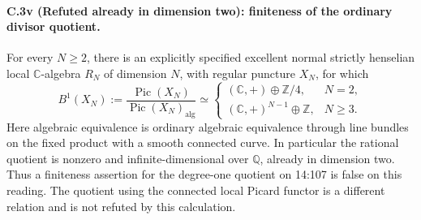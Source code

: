 \paragraph{C.3v (Refuted already in dimension two): finiteness of the ordinary divisor quotient.}
For every $N\ge2$, there is an explicitly specified excellent
normal strictly henselian local $\mathbb C$-algebra $R_N$ of
dimension $N$, with regular puncture $X_N$, for which
\begin{equation}\label{eq:C3v-ordinary-quotient}
 B^1(X_N):=\frac{\operatorname{Pic}(X_N)}
                   {\operatorname{Pic}(X_N)_{\mathrm{alg}}}
 \simeq
 \begin{cases}
  (\mathbb C,+)\oplus\mathbb Z/4,&N=2,\\
  (\mathbb C,+)^{N-1}\oplus\mathbb Z,&N\ge3.
 \end{cases}
\end{equation}
Here algebraic equivalence is ordinary algebraic equivalence
through line bundles on the fixed product with a smooth
connected curve. In particular the rational quotient is
nonzero and infinite-dimensional over $\mathbb Q$, already
in dimension two. Thus a finiteness assertion for the
degree-one quotient on 14:107 is false on this reading.
The quotient using the connected local Picard functor is a
different relation and is not refuted by this calculation.

